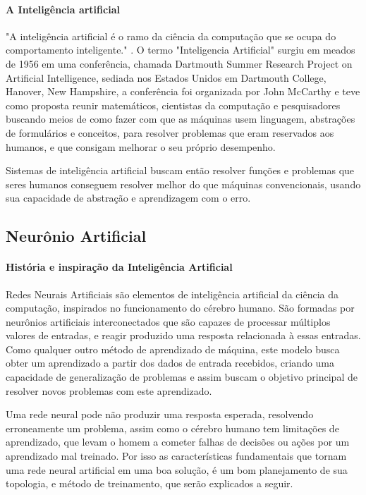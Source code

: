 \documentclass[	12pt, Times, openright, twoside, a4paper, english, brazil]{abntex2}
\begin{document}
        \paragraph*{A Inteligência artificial} "A inteligência artificial é o ramo da ciência da computação que se ocupa do comportamento inteligente." \cite{Luger2004}.
          O termo "Inteligencia Artificial" surgiu em meados de 1956 em uma conferência, chamada Dartmouth Summer Research Project on Artificial Intelligence, sediada nos Estados Unidos em Dartmouth College, Hanover, New Hampshire, a conferência foi organizada por John McCarthy e teve como proposta reunir matemáticos, cientistas da computação e pesquisadores buscando meios de como fazer com que as máquinas usem linguagem, abstrações de formulários e conceitos, para resolver problemas que eram reservados aos humanos, e que consigam melhorar o seu próprio desempenho.

          Sistemas de inteligência artificial buscam então resolver funções e problemas que seres humanos conseguem resolver melhor do que máquinas convencionais, usando sua capacidade de abstração e aprendizagem com o erro.

        \subsection{Neurônio Artificial}
         
          \paragraph*{História e inspiração da Inteligência Artificial}
            Redes Neurais Artificiais são elementos de inteligência artificial da ciência da computação, inspirados no funcionamento do cérebro humano.
            São formadas por neurônios artificiais interconectados que são capazes de processar múltiplos valores de entradas, e reagir produzido uma resposta relacionada à essas entradas.
            Como qualquer outro método de aprendizado de máquina, este modelo busca obter um aprendizado a partir dos dados de entrada recebidos, criando uma capacidade de generalização de problemas e assim buscam o objetivo principal de resolver novos problemas com este aprendizado.

            Uma rede neural pode não produzir uma resposta esperada, resolvendo erroneamente um problema, assim como o cérebro humano tem limitações de aprendizado, que levam o homem a cometer falhas de decisões ou ações por um aprendizado mal treinado. Por isso as características fundamentais que tornam uma rede neural artificial em uma boa solução, é um bom planejamento de sua topologia, e método de treinamento, que serão explicados a seguir.
\end{document}
